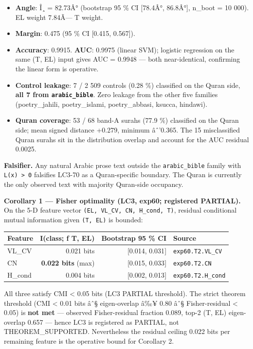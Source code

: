 \documentclass[
]{article}
\newcounter{none} %
\providecommand{\tightlist}{%
  \setlength{\itemsep}{0pt}\setlength{\parskip}{0pt}}
\begin{document}
\begin{itemize}
\tightlist
\item
  \textbf{Angle}: Î¸ = 82.73Â° (bootstrap 95 \% CI {[}78.4Â°, 86.8Â°{]},
  n\_boot = 10 000). EL weight 7.84Ã--- T weight.
\item
  \textbf{Margin}: 0.475 (95 \% CI {[}0.415, 0.567{]}).
\item
  \textbf{Accuracy}: 0.9915. \textbf{AUC}: 0.9975 (linear SVM); logistic
  regression on the same (T, EL) input gives AUC = 0.9948 --- both
  near-identical, confirming the linear form is operative.
\item
  \textbf{Control leakage}: 7 / 2 509 controls (0.28 \%) classified on
  the Quran side, \textbf{all 7 from \texttt{arabic\_bible}}. Zero
  leakage from the other five families (poetry\_jahili, poetry\_islami,
  poetry\_abbasi, ksucca, hindawi).
\item
  \textbf{Quran coverage}: 53 / 68 band-A surahs (77.9 \%) classified on
  the Quran side; mean signed distance +0.279, minimum âˆ'0.365. The 15
  misclassified Quran surahs sit in the distribution overlap and account
  for the AUC residual 0.0025.
\end{itemize}

\textbf{Falsifier.} Any natural Arabic prose text outside the
\texttt{arabic\_bible} family with \texttt{L(x)\ \textgreater{}\ 0}
falsifies LC3-70 as a Quran-specific boundary. The Quran is currently
the only observed text with majority Quran-side occupancy.

\textbf{Corollary 1 --- Fisher optimality (LC3, exp60; registered
PARTIAL).} On the 5-D feature vector
\texttt{(EL,\ VL\_CV,\ CN,\ H\_cond,\ T)}, residual conditional mutual
information given \texttt{(T,\ EL)} is bounded:

{\def\LTcaptype{none} %
\begin{longtable}[]{@{}lrrl@{}}
\toprule\noalign{}
Feature & I(class; f \textbar{} T, EL) & Bootstrap 95 \% CI & Source \\
\midrule\noalign{}
\endhead
\bottomrule\noalign{}
\endlastfoot
VL\_CV & 0.021 bits & {[}0.014, 0.031{]} & \texttt{exp60.T2.VL\_CV} \\
CN & \textbf{0.022 bits} (max) & {[}0.015, 0.033{]} &
\texttt{exp60.T2.CN} \\
H\_cond & 0.004 bits & {[}0.002, 0.013{]} & \texttt{exp60.T2.H\_cond} \\
\end{longtable}
}

All three satisfy CMI \textless{} 0.05 bits (LC3 PARTIAL threshold). The
strict theorem threshold (CMI \textless{} 0.01 bits âˆ§ eigen-overlap
â‰¥ 0.80 âˆ§ Fisher-residual \textless{} 0.05) is \textbf{not met} ---
observed Fisher-residual fraction 0.089, top-2 (T, EL) eigen-overlap
0.657 --- hence LC3 is registered as PARTIAL, not THEOREM\_SUPPORTED.
Nevertheless the residual ceiling 0.022 bits per remaining feature is
the operative bound for Corollary 2.
\end{document}
